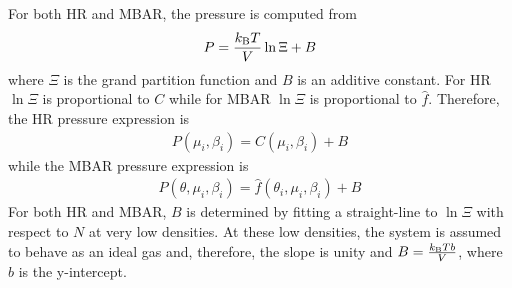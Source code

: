 \documentclass[journal=jced,manuscript=article]{achemso}
\begin{document}
For both HR and MBAR, the pressure is computed from
\begin{equation} \label{eq: press}
P = \frac{k_{\rm B} T}{V} \ln \Xi + B
\end{equation}
where $\Xi$ is the grand partition function and $B$ is an additive constant.
For HR $\ln \Xi$ is proportional to $C$ while for MBAR $\ln \Xi$ is proportional to $\hat f$. Therefore, the HR pressure expression is
\begin{eqnarray} \label{eq: HR press alt}
P(\mu_i,\beta_i) = C(\mu_i,\beta_i) + B
\end{eqnarray}
while the MBAR pressure expression is
\begin{eqnarray} \label{eq: MBAR press alt}
P(\theta,\mu_i,\beta_i) = \hat f(\theta_i,\mu_i,\beta_i) + B
\end{eqnarray}
For both HR and MBAR, $B$ is determined by fitting a straight-line to $\ln \Xi$ with respect to $N$ at very low densities. At these low densities, the system is assumed to behave as an ideal gas and, therefore, the slope is unity and $B = \frac{k_{\rm B} T b}{V}$, where $b$ is the y-intercept.
\end{document}
